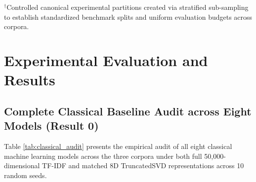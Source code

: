 \documentclass{article}
\begin{document}
\begin{table}[!htbp]
\centering
\caption{Benchmark Corpus Characteristics, Accounting Tiers, and Split Partitions.}
\label{tab:corpora}
\vspace{2pt}
\flushleft
\scriptsize{$^\dagger$Controlled canonical experimental partitions created via stratified sub-sampling to establish standardized benchmark splits and uniform evaluation budgets across corpora.}
\end{table}

\section{Experimental Evaluation and Results}
\label{sec:results}

\subsection{Complete Classical Baseline Audit across Eight Models (Result 0)}
Table \ref{tab:classical_audit} presents the empirical audit of all eight classical machine learning models across the three corpora under both full 50,000-dimensional TF-IDF and matched 8D TruncatedSVD representations across 10 random seeds.
\end{document}
